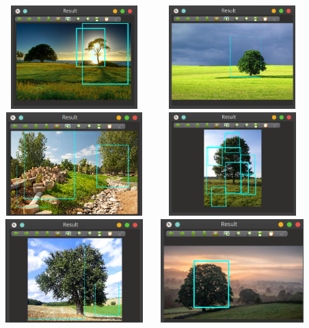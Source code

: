\documentclass[]{report}
\begin{document}
\begin{center}
	\includegraphics[width=6cm,height=4cm]{img/final/Screenshot_20200708_201030}
	\includegraphics[width=6cm,height=4cm]{img/final/Screenshot_20200708_201111}
	\includegraphics[width=6cm,height=4cm]{img/final/Screenshot_20200708_201208}
	\includegraphics[width=6cm,height=4cm]{img/final/Screenshot_20200708_201238}
	\includegraphics[width=6cm,height=4cm]{img/final/Screenshot_20200708_201325}
	\includegraphics[width=6cm,height=4cm]{img/final/Screenshot_20200708_201347}
\end{center}
\end{document}
